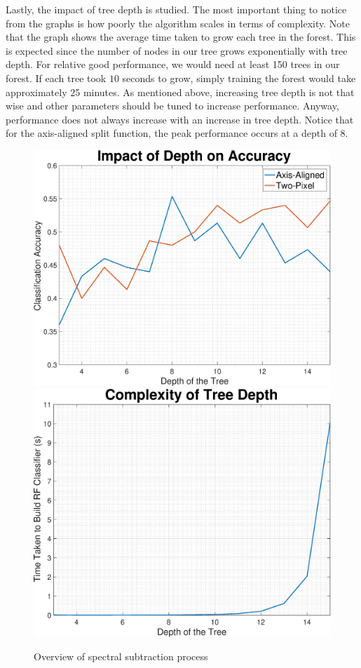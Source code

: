\documentclass[a4paper,pra,twocolumn,10pt,aps,longbibliography,nobalancelastpage]{revtex4-1}
\begin{document}
Lastly, the impact of tree depth is studied. The most important thing to notice from the graphs is how poorly the algorithm scales in terms of complexity. Note that the graph shows the average time taken to grow each tree in the forest. This is expected since the number of nodes in our tree grows exponentially with tree depth. For relative good performance, we would need at least 150 trees in our forest. If each tree took $10$ seconds to grow, simply training the forest would take approximately 25 minutes. As mentioned above, increasing tree depth is not that wise and other parameters should be tuned to increase performance. Anyway, performance does not always increase with an increase in tree depth. Notice that for the axis-aligned split function, the peak performance occurs at a depth of 8. 

\begin{figure}[H]
	\centering
    \includegraphics[width=0.49\columnwidth]{depth_acc}
	\includegraphics[width=0.49\columnwidth]{depth_complexity}
    \caption{Overview of spectral subtraction process}
\end{figure}
\end{document}
